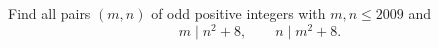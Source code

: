 Find all pairs $(m,n)$ of odd positive integers with $m,n \leq 2009$ and 
$$m \mid n^2+8, \qquad n \mid m^2+8.$$